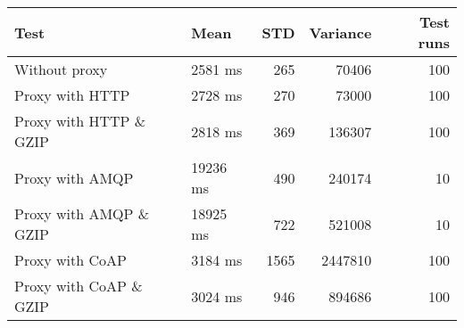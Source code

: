 \begin{tabularx}{\textwidth}{llrrr}
\hline
 Test                   & Mean     &   STD &   Variance &   Test runs \\
\hline
 Without proxy          & 2581 ms  &   265 &      70406 &         100 \\
 Proxy with HTTP        & 2728 ms  &   270 &      73000 &         100 \\
 Proxy with HTTP \& GZIP & 2818 ms  &   369 &     136307 &         100 \\
 Proxy with AMQP        & 19236 ms &   490 &     240174 &          10 \\
 Proxy with AMQP \& GZIP & 18925 ms &   722 &     521008 &          10 \\
 Proxy with CoAP        & 3184 ms  &  1565 &    2447810 &         100 \\
 Proxy with CoAP \& GZIP & 3024 ms  &   946 &     894686 &         100 \\
\hline
\end{tabularx}